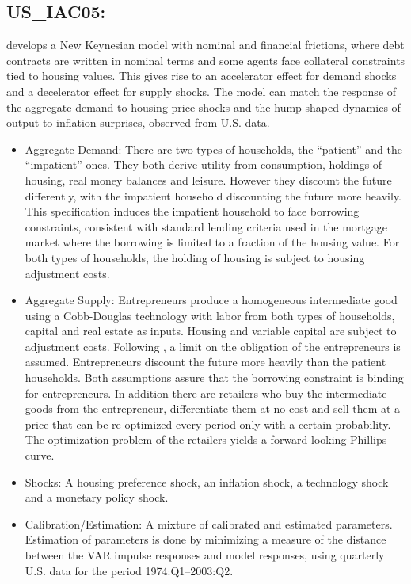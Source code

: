 \documentclass[11pt,a4paper]{article}
\begin{document}
	
	
	\subsection{US\_IAC05: \cite{Iacoviello2005}}
	\label{USIAC05}
	\cite{Iacoviello2005} develops a New Keynesian model with nominal and financial frictions, where debt contracts are written in nominal terms and some agents face collateral constraints tied to housing values. This gives rise to an accelerator effect for demand shocks and a decelerator effect for supply shocks. The model can match the response of the aggregate demand to housing price shocks and the hump-shaped dynamics of output to inflation surprises, observed from U.S. data.
	
	\begin{itemize}
		
		\item Aggregate Demand: There are two types of households, the ``patient'' and the ``impatient'' ones. They both derive utility from consumption, holdings of housing, real money balances and leisure. However they discount the future differently, with the impatient household discounting the future more heavily. This specification induces the impatient household to face borrowing constraints, consistent with standard lending criteria used in the mortgage market where the borrowing is limited to a fraction of the housing value. For both types of households, the holding of housing is subject to housing adjustment costs.
		
		\item Aggregate Supply: Entrepreneurs produce a homogeneous intermediate good using a Cobb-Douglas technology with labor from both types of households, capital and real estate as inputs. Housing and variable capital are subject to adjustment costs. Following \cite{KiyotakiMoore1999}, a limit on the obligation of the entrepreneurs is assumed. Entrepreneurs discount the future more heavily than the patient households. Both assumptions assure that the borrowing constraint is binding for entrepreneurs. In addition there are retailers who buy the intermediate goods from the entrepreneur, differentiate them at no cost and sell them at a price that can be re-optimized every period only with a certain probability. The optimization problem of the retailers yields a forward-looking Phillips curve.
		
		\item Shocks: A housing preference shock, an inflation shock, a technology shock and a monetary policy shock.
		
		\item Calibration/Estimation: A mixture of calibrated and estimated parameters. Estimation of parameters is done by minimizing a measure of the distance between the VAR impulse responses and model responses, using quarterly U.S. data for the period 1974:Q1--2003:Q2.
		
		
		
	\end{itemize}
	
\end{document}
